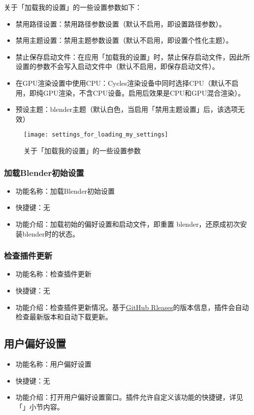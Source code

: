 \documentclass{../../public_resources/doc}
\begin{document}
\noindent 关于「加载我的设置」的一些设置参数如下：
\hypertarget{加载我的设置小节}{}
\begin{itemize}
    \item 禁用路径设置：禁用路径参数设置（默认不启用，即设置路径参数）。
    \item 禁用主题设置：禁用主题参数设置（默认不启用，即设置个性化主题）。
    \item 禁止保存启动文件：在应用「加载我的设置」时，禁止保存启动文件，因此所设置的参数不会写入启动文件中（默认不启用，即保存启动文件）。
    \item 在GPU渲染设置中使用CPU：Cycles渲染设备中同时选择CPU（默认不启用，即纯GPU渲染，不含CPU设备。启用后效果是CPU和GPU混合渲染）。
    \item 预设主题：blender主题（默认白色，当启用「禁用主题设置」后，该选项无效）
\end{itemize}

\begin{figure}[h!]
    \texttt{[image: settings\_for\_loading\_my\_settings]}
    \caption{关于「加载我的设置」的一些设置参数}
    \label{加载我的设置的设置参数}
\end{figure}

\subsubsection{加载Blender初始设置}
\begin{itemize}
    \item 功能名称：加载Blender初始设置
    \item 快捷键：无
    \item 功能介绍：加载初始的偏好设置和启动文件，即重置 blender，还原成初次安装blender时的状态。
\end{itemize}

\subsubsection{检查插件更新}
\begin{itemize}
    \item 功能名称：检查插件更新
    \item 快捷键：无
    \item 功能介绍：检查插件更新情况。基于\href{https://github.com/Mister-Kin/ToggleLanguage/releases}{GitHub Rleases}的版本信息，插件会自动检查最新版本和自动下载更新。
\end{itemize}

\subsection{用户偏好设置}
\begin{itemize}
    \item 功能名称：用户偏好设置
    \item 快捷键：无
    \item 功能介绍：打开用户偏好设置窗口。插件允许自定义该功能的快捷键，详见「」小节内容。
\end{itemize}
\end{document}
